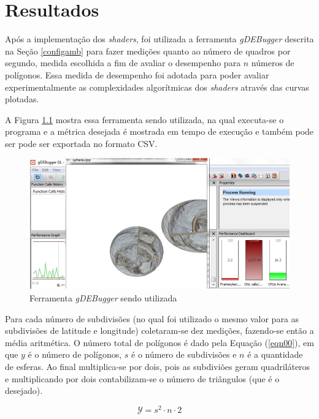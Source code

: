 \chapter[Resultados]{Resultados}

	Após a implementação dos \textit{shaders}, foi utilizada a ferramenta \textit{gDEBugger} descrita na Seção \ref{configamb} para fazer medições quanto ao número de quadros por segundo, medida escolhida a fim de avaliar o desempenho para $n$ números de polígonos. Essa medida de desempenho foi adotada para poder avaliar experimentalmente as complexidades algorítmicas dos \textit{shaders} através das curvas plotadas.

	 A   Figura \ref{gdebugger} mostra essa ferramenta sendo utilizada, na qual executa-se o programa e a métrica desejada é mostrada em tempo de execução e também pode ser pode ser exportada no formato CSV.  

	\begin{figure}[h]
	\centering
		\includegraphics[keepaspectratio=true,scale=0.6]{figuras/gdebugger.jpg}
	\caption{Ferramenta \textit{gDEBugger} sendo utilizada}
	\label{gdebugger}
	\end{figure}

	 Para cada número de subdivisões (no qual foi utilizado o mesmo valor para as subdivisões de latitude e longitude) coletaram-se dez medições, fazendo-se então a média aritmética. O número total de polígonos é dado pela Equação 
(\ref{eqn00}), em que $y$ é o número de polígonos, $s$ é o número de subdivisões e $n$ é a quantidade de esferas. Ao final multiplica-se por dois, pois as subdiviões geram quadriláteros e multiplicando por dois contabilizam-se o número de triângulos (que é o desejado).

	\begin{equation}
	\label{eqn00}
		\mathcal{Y} = s^{2} \cdot n \cdot 2
	\end{equation}

